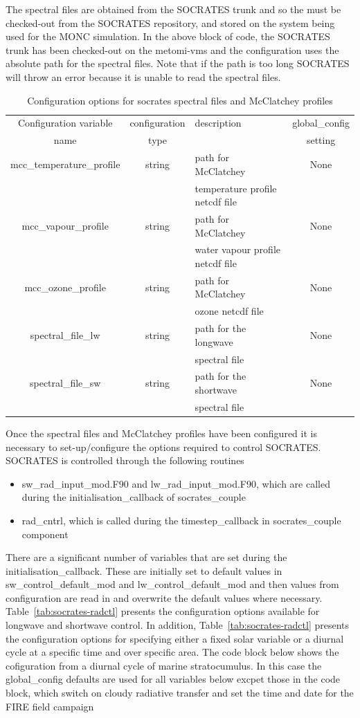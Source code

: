 \documentclass[a4paper,11pt]{article}
\begin{document}
The spectral files are obtained from the SOCRATES trunk and so the must be
checked-out from the SOCRATES repository, and stored on the system
being used for the MONC simulation. In the above block of code, the SOCRATES trunk
has been checked-out on the metomi-vms and the configuration uses the absolute
path for the spectral files. Note that if the path is too long SOCRATES will
throw an error because it is unable to read the spectral files.

\begin{table}[H]
  \protect\caption{Configuration options for socrates spectral files and
  McClatchey profiles}
\label{tab:socrates_spectral}
\begin{tabular}{|c|c|l|c|}
\hline
Configuration variable & configuration & description & global\_config \tabularnewline
name & type & & setting \tabularnewline
\hline
\hline
  mcc\_temperature\_profile & string & path for McClatchey & None \tabularnewline
   &  & temperature profile netcdf file &  \tabularnewline
\hline
  mcc\_vapour\_profile  & string & path for McClatchey & None \tabularnewline
    &   & water vapour profile netcdf file &  \tabularnewline
\hline
  mcc\_ozone\_profile  & string & path for McClatchey & None \tabularnewline
   &  & ozone netcdf file & \tabularnewline
\hline
  spectral\_file\_lw & string & path for the longwave & None \tabularnewline
    &  & spectral file & \tabularnewline
\hline
  spectral\_file\_sw & string & path for the shortwave & None \tabularnewline
    &  & spectral file & \tabularnewline
\hline
\hline
\end{tabular}
\end{table}

Once the spectral files and McClatchey profiles have been configured it is
necessary to set-up/configure the options required to control SOCRATES.
SOCRATES is controlled through the following routines
\begin{itemize}
  \item {sw\_rad\_input\_mod.F90 and lw\_rad\_input\_mod.F90, which are called during
  the initialisation\_callback of socrates\_couple}
  \item {rad\_cntrl, which is called during the timestep\_callback in socrates\_couple component}
\end{itemize}
There are a significant number of variables that are set during the initialisation\_callback.
These are initially set to default values in sw\_control\_default\_mod and
lw\_control\_default\_mod and then values from configuration are read in and overwrite
the default values where necessary. Table~\ref{tab:socrates-radctl} presents the
configuration options available for longwave and shortwave control. In addition,
Table~\ref{tab:socrates-radctl} presents the configuration options for specifying
either a fixed solar variable or a diurnal cycle at a specific time and over
specific area. The code block below shows the cofiguration from a diurnal cycle of
marine stratocumulus. In this case the global\_config defaults are used for all
variables below excpet those in the code block, which switch on cloudy radiative
transfer and set the time and date for the FIRE field campaign
\end{document}
